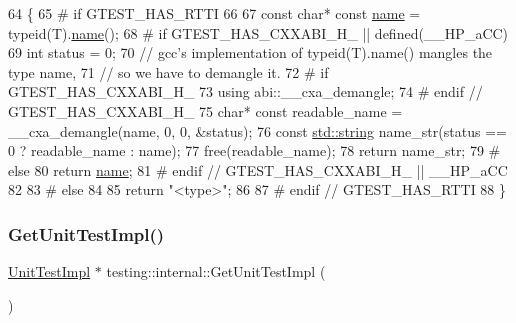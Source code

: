 \begin{DoxyCode}
64                         \{
65 \textcolor{preprocessor}{# if GTEST\_HAS\_RTTI}
66 
67   \textcolor{keyword}{const} \textcolor{keywordtype}{char}* \textcolor{keyword}{const} \hyperlink{namespaceinteractive__marker_a447655961b3d3ca3c5a2a9d3d769436d}{name} = \textcolor{keyword}{typeid}(T).\hyperlink{namespaceinteractive__marker_a447655961b3d3ca3c5a2a9d3d769436d}{name}();
68 \textcolor{preprocessor}{#  if GTEST\_HAS\_CXXABI\_H\_ || defined(\_\_HP\_aCC)}
69   \textcolor{keywordtype}{int} status = 0;
70   \textcolor{comment}{// gcc's implementation of typeid(T).name() mangles the type name,}
71   \textcolor{comment}{// so we have to demangle it.}
72 \textcolor{preprocessor}{#   if GTEST\_HAS\_CXXABI\_H\_}
73   \textcolor{keyword}{using} abi::\_\_cxa\_demangle;
74 \textcolor{preprocessor}{#   endif  // GTEST\_HAS\_CXXABI\_H\_}
75   \textcolor{keywordtype}{char}* \textcolor{keyword}{const} readable\_name = \_\_cxa\_demangle(name, 0, 0, &status);
76   \textcolor{keyword}{const} \hyperlink{namespacetesting_1_1internal_a8e8ff5b11e64078831112677156cb111}{std::string} name\_str(status == 0 ? readable\_name : name);
77   free(readable\_name);
78   \textcolor{keywordflow}{return} name\_str;
79 \textcolor{preprocessor}{#  else}
80   \textcolor{keywordflow}{return} \hyperlink{namespaceinteractive__marker_a447655961b3d3ca3c5a2a9d3d769436d}{name};
81 \textcolor{preprocessor}{#  endif  // GTEST\_HAS\_CXXABI\_H\_ || \_\_HP\_aCC}
82 
83 \textcolor{preprocessor}{# else}
84 
85   \textcolor{keywordflow}{return} \textcolor{stringliteral}{"<type>"};
86 
87 \textcolor{preprocessor}{# endif  // GTEST\_HAS\_RTTI}
88 \}
\end{DoxyCode}
\mbox{\label{namespacetesting_1_1internal_a9bd0caf5d16512de38b39599c13ee634}} 
\subsubsection{\texorpdfstring{Get\+Unit\+Test\+Impl()}{GetUnitTestImpl()}}
{\footnotesize\ttfamily \hyperlink{classtesting_1_1internal_1_1UnitTestImpl}{Unit\+Test\+Impl} $\ast$ testing\+::internal\+::\+Get\+Unit\+Test\+Impl (\begin{DoxyParamCaption}{ }\end{DoxyParamCaption})\hspace{0.3cm}{\ttfamily [inline]}}



